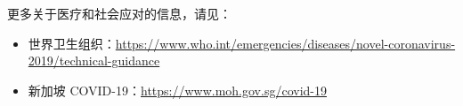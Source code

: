 \documentclass[onecolumn,journal]{IEEEtran}
\begin{document}
\vspace{2ex}
更多关于医疗和社会应对的信息，请见：
\begin{itemize}
\item 世界卫生组织：\url{https://www.who.int/emergencies/diseases/novel-coronavirus-2019/technical-guidance}
\item 新加坡 COVID-19：\url{https://www.moh.gov.sg/covid-19}
\end{itemize}






% 

\end{document}
